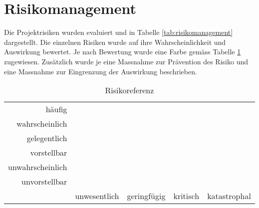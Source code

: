 \section{Risikomanagement}

Die Projektrisiken wurden evaluiert und in Tabelle \ref{tab:risikomanagement} dargestellt. Die einzelnen Risiken wurde auf ihre Wahrscheinlichkeit und Auswirkung bewertet. Je nach Bewertung wurde eine Farbe gemäss Tabelle \ref{tab:risikoreferenz} zugewiesen. Zusätzlich wurde je eine Massnahme zur Prävention des Risiko und eine Massnahme zur Eingrenzung der Auswirkung beschrieben.

\begin{table}[h!]
	\centering
	\begin{tabular}{r || c c c c}
		häufig 		
		& \cellcolor{red} 
		& \cellcolor{red}
		& \cellcolor{red}
		& \cellcolor{red} \\
		wahrscheinlich		
		& \cellcolor{yellow} 
		& \cellcolor{yellow} 
		& \cellcolor{red}
		& \cellcolor{red} \\
		gelegentlich		
		& \cellcolor{yellow}
		& \cellcolor{yellow}
		& \cellcolor{yellow}
		& \cellcolor{red} \\
		vorstellbar		
		& \cellcolor{green}
		& \cellcolor{yellow}
		& \cellcolor{yellow}
		& \cellcolor{yellow} \\
		unwahrscheinlich	
		& \cellcolor{green}
		& \cellcolor{green}
		& \cellcolor{yellow}
		& \cellcolor{yellow} \\
		unvorstellbar		
		& \cellcolor{green}
		& \cellcolor{green}
		& \cellcolor{green}
		& \cellcolor{green} \\
		\hline
		& unwesentlich & geringfügig & kritisch & katastrophal
	\end{tabular}
	\caption{Risikoreferenz}
	\label{tab:risikoreferenz}
\end{table}

